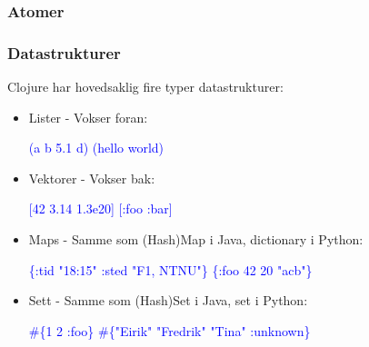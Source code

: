 \documentclass{beamer}
\begin{document}
\begin{frame}
  \frametitle{Atomer}
\begin{semiverbatim}


 \textcolor{blue}{ 
 
}





\end{semiverbatim}
\end{frame}

\begin{frame}[fragile]
  \frametitle{Datastrukturer}
  Clojure har hovedsaklig fire typer datastrukturer:
\begin{itemize}
\item<2-> Lister - Vokser foran:
\begin{semiverbatim}
\textcolor{blue}{(a\visible<-7>{\alert<7>{,}} b\visible<-7>{\alert<7>{,}} 5.1 d) (hello world)}
\end{semiverbatim}
\item<3-> Vektorer - Vokser bak:
\begin{semiverbatim}
\textcolor{blue}{[42\visible<-7>{\alert<7>{,}} 3.14 1.3e20] [:foo :bar]}
\end{semiverbatim}
\item<4-> Maps - Samme som (Hash)Map i Java, dictionary i Python:
\begin{semiverbatim}
\textcolor{blue}{\{:tid "18:15"\visible<-7>{\alert<7>{,}} :sted "F1, NTNU"\} \{:foo 42 20 "acb"\}}
\end{semiverbatim}
\item<5-> Sett - Samme som (Hash)Set i Java, set i Python:
\begin{semiverbatim}
\textcolor{blue}{#\{1\visible<-7>{\alert<7>{,}} 2 :foo\} #\{"Eirik" "Fredrik" "Tina" :unknown\}}
\end{semiverbatim}
\end{itemize}
\end{frame}
\end{document}
